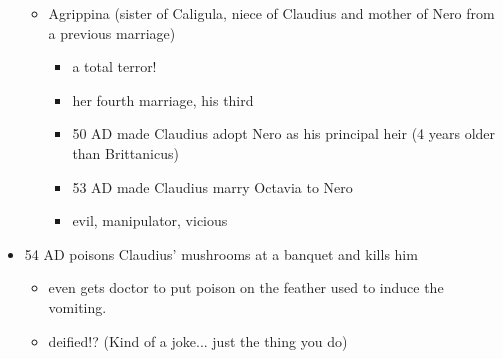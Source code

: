 \documentclass[12pt, twoside]{article}
\begin{document}
\begin{itemize}
\begin{itemize}
\begin{itemize}
		\end{itemize}
	\item Agrippina (sister of Caligula, niece of Claudius and mother of Nero from a previous marriage)
		\begin{itemize}
		\item a total terror!
		\item her fourth marriage, his third
		\item 50 AD made Claudius adopt Nero as his principal heir (4 years older than Brittanicus)
		\item 53 AD made Claudius marry Octavia to Nero
		\item evil, manipulator, vicious
		\end{itemize}
	\end{itemize}
\item 54 AD poisons Claudius’ mushrooms at a banquet and kills him
	\begin{itemize}
	\item even gets doctor to put poison on the feather used to induce the vomiting.
	\item deified!? (Kind of a joke... just the thing you do)
	\end{itemize}
\end{itemize}
\end{document}

